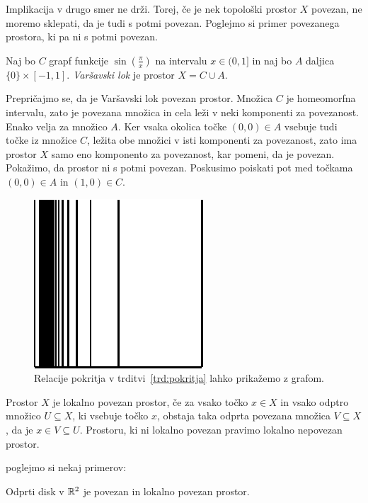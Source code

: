 \documentclass[../TG_magistrsko_delo_sections.tex]{subfiles}
\begin{document}
Implikacija v drugo smer ne drži. Torej, če je nek topološki prostor $X$ povezan, ne moremo sklepati, da je tudi s potmi povezan. Poglejmo si primer povezanega prostora, ki pa ni s potmi povezan.

\begin{definicija}
Naj bo $C$ grapf funkcije $\sin\left(\frac{\pi}{x}\right)$ na intervalu $x \in (0 , 1]$ in naj bo $A$ daljica $\{ 0 \} \times [-1 , 1]$. \emph{Varšavski lok} je prostor $X = C \cup A$.
\end{definicija}

Prepričajmo se, da je Varšavski lok povezan prostor. Množica $C$ je homeomorfna intervalu, zato je povezana množica in cela leži v neki komponenti za povezanost. Enako velja za množico $A$. Ker vsaka okolica točke $(0, 0) \in A$ vsebuje tudi točke iz množice $C$, ležita obe množici v isti komponenti za povezanost, zato ima prostor $X$ samo eno komponento za povezanost, kar pomeni, da je povezan.
Pokažimo, da prostor ni s potmi povezan. Poskusimo poiskati pot med točkama $(0, 0) \in A$ in $(1, 0) \in C$.

\begin{figure}[h]
  \centering
  \includegraphics{glavnik.pdf}
  \caption[Primer vektorske slike.]{Relacije pokritja v trditvi~\ref{trd:pokritja} lahko prikažemo z grafom.}
  \label{fig:varsavski_lok}
\end{figure}

\begin{definicija}
Prostor $X$ je lokalno povezan prostor, če za vsako točko $x \in X$ in vsako odptro množico $U \subseteq X$, ki vsebuje točko $x$, obstaja taka odprta povezana množica $V \subseteq X$, da je $x \in V \subseteq U$. Prostoru, ki ni lokalno povezan pravimo lokalno nepovezan prostor.
\end{definicija}

poglejmo si nekaj primerov:
\begin{primer}
Odprti disk v $\mathbb R^2$ je povezan in lokalno povezan prostor.
\end{primer}
\end{document}
